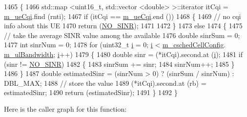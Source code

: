 \begin{DoxyCode}
1465 \{
1466   std::map <uint16\_t, std::vector <double> >::iterator itCqi = \hyperlink{classns3_1_1TdTbfqFfMacScheduler_a5cf85878fa75fd31bdc63527492e9270}{m\_ueCqi}.find (rnti);
1467   \textcolor{keywordflow}{if} (itCqi == \hyperlink{classns3_1_1TdTbfqFfMacScheduler_a5cf85878fa75fd31bdc63527492e9270}{m\_ueCqi}.end ())
1468     \{
1469       \textcolor{comment}{// no cqi info about this UE}
1470       \textcolor{keywordflow}{return} (\hyperlink{cqa-ff-mac-scheduler_8h_a520d71777be043568160c783a9c65fd5}{NO\_SINR});
1471 
1472     \}
1473   \textcolor{keywordflow}{else}
1474     \{
1475       \textcolor{comment}{// take the average SINR value among the available}
1476       \textcolor{keywordtype}{double} sinrSum = 0;
1477       \textcolor{keywordtype}{int} sinrNum = 0;
1478       \textcolor{keywordflow}{for} (uint32\_t \hyperlink{bernuolliDistribution_8m_a6f6ccfcf58b31cb6412107d9d5281426}{i} = 0; \hyperlink{bernuolliDistribution_8m_a6f6ccfcf58b31cb6412107d9d5281426}{i} < \hyperlink{classns3_1_1TdTbfqFfMacScheduler_a3ac3e4b1b3818ff204d6ff6c89c19f4d}{m\_cschedCellConfig}.
      \hyperlink{structns3_1_1FfMacCschedSapProvider_1_1CschedCellConfigReqParameters_a5ab5b102878e6e7e7727a14af4a64d2f}{m\_ulBandwidth}; \hyperlink{bernuolliDistribution_8m_a6f6ccfcf58b31cb6412107d9d5281426}{i}++)
1479         \{
1480           \textcolor{keywordtype}{double} sinr = (*itCqi).second.at (\hyperlink{bernuolliDistribution_8m_a6f6ccfcf58b31cb6412107d9d5281426}{i});
1481           \textcolor{keywordflow}{if} (sinr != \hyperlink{cqa-ff-mac-scheduler_8h_a520d71777be043568160c783a9c65fd5}{NO\_SINR})
1482             \{
1483               sinrSum += sinr;
1484               sinrNum++;
1485             \}
1486         \}
1487       \textcolor{keywordtype}{double} estimatedSinr = (sinrNum > 0) ? (sinrSum / sinrNum) : DBL\_MAX;
1488       \textcolor{comment}{// store the value}
1489       (*itCqi).second.at (rb) = estimatedSinr;
1490       \textcolor{keywordflow}{return} (estimatedSinr);
1491     \}
1492 \}
\end{DoxyCode}


Here is the caller graph for this function\+:



